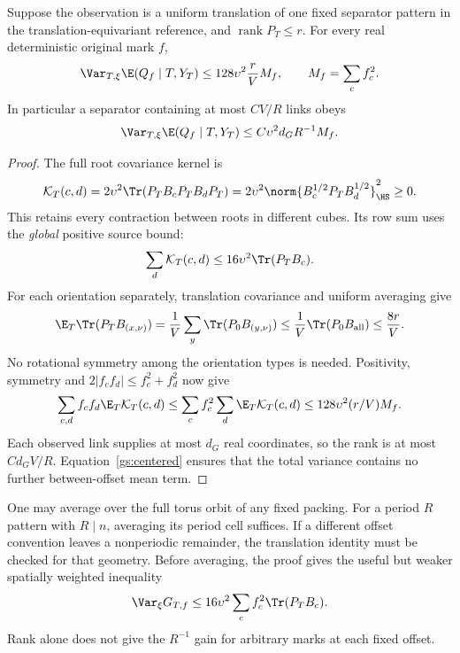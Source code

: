 \begin{theorem}
\label{gs:separator}
Suppose the observation is a uniform translation of one fixed separator pattern
in the translation-equivariant reference, and \(\operatorname{rank}P_T\le r\).
For every real deterministic original mark \(f\),
\begin{equation}
 \Var_{T,\xi}\E(Q_f\mid T,Y_T)
 \le128\upsilon^2\frac rV M_f,
 \qquad M_f=\sum_cf_c^2.
 \label{gs:rankgain}
\end{equation}
In particular a separator containing at most \(CV/R\) links obeys
\begin{equation}
 \Var_{T,\xi}\E(Q_f\mid T,Y_T)
 \le C\upsilon^2d_G R^{-1}M_f.
 \label{gs:separatorgain}
\end{equation}
\end{theorem}
\begin{proof}
The full root covariance kernel is
\[
 \mathcal K_T(c,d)
 =2\upsilon^2\Tr(P_TB_cP_TB_dP_T)
 =2\upsilon^2\norm{B_c^{1/2}P_TB_d^{1/2}}_{\HS}^2\ge0.
\]
This retains every contraction between roots in different cubes. Its row sum
uses the \emph{global} positive source bound:
\begin{equation}
 \sum_d\mathcal K_T(c,d)
 \le16\upsilon^2\Tr(P_TB_c).
 \label{gs:rowsum}
\end{equation}
For each orientation separately, translation covariance and uniform averaging
give
\[
 \E_T\Tr(P_TB_{(x,\nu)})
 =\frac1V\sum_y\Tr(P_0B_{(y,\nu)})
 \le\frac1V\Tr(P_0B_{\rm all})\le\frac{8r}{V}.
\]
No rotational symmetry among the orientation types is needed. Positivity,
symmetry and \(2|f_cf_d|\le f_c^2+f_d^2\) now give
\[
 \sum_{c,d}f_cf_d\E_T\mathcal K_T(c,d)
 \le\sum_cf_c^2\sum_d\E_T\mathcal K_T(c,d)
 \le128\upsilon^2(r/V)M_f.
\]
Each observed link supplies at most \(d_G\) real coordinates, so the rank is
at most \(Cd_GV/R\). Equation~\eqref{gs:centered} ensures that the total
variance contains no further between-offset mean term.
\end{proof}

One may average over the full torus orbit of any fixed packing. For a period
\(R\) pattern with \(R\mid n\), averaging its period cell suffices. If a
different offset convention leaves a nonperiodic remainder, the translation
identity must be checked for that geometry. Before averaging, the proof gives
the useful but weaker spatially weighted inequality
\begin{equation}
 \Var_\xi G_{T,f}
 \le16\upsilon^2\sum_cf_c^2\Tr(P_TB_c).
 \label{gs:fixedoffset}
\end{equation}
Rank alone does not give the \(R^{-1}\) gain for arbitrary marks at each fixed
offset.


